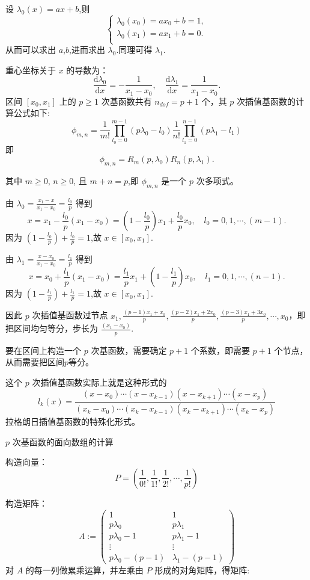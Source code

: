 \documentclass[12pt,a4paper]{article}
\begin{document}
设 $\lambda_0 (x)=ax+b$,则
$$
\begin{cases}
\lambda _0 (x_0)=ax_0+b=1,\\
\lambda _0 (x_1)=ax_1+b=0.\\
\end{cases}
$$
从而可以求出 $a$,$b$,进而求出 $\lambda _0$.同理可得 $\lambda _1$.

重心坐标关于 $x$ 的导数为：
$$
\frac{\mathrm d \lambda_0}{\mathrm dx} = -\frac{1}{x_1 - x_0},\quad 
\frac{\mathrm d \lambda_1}{\mathrm dx} = \frac{1}{x_1 - x_0}.
$$
区间 $[x_0, x_1]$ 上的 $p\geq 1$ 次基函数共有 
$n_{dof} = p+1$ 个，其 $p$ 次插值基函数的计算公式如下:
$$
\phi_{m,n}= \frac{1}{m!}\prod_{l_0 = 0}^{m - 1}(p\lambda_0 -l_0)\frac{1}{n!}\prod_{l_1 = 0}^{n - 1}(p\lambda_1 -l_1)
$$
即
$$
\phi_{m,n}= R_m (p,\lambda_0)R_n (p,\lambda_1).
$$

其中 $m\geq 0$, $n\geq 0$, 且 $m+n=p$,即 $\phi_{m,n}$ 是一个 $p$ 次多项式。

由 $\lambda_0=\frac{x_1 - x}{x_1 - x_0}=\frac{l_0}{p}$ 得到
$$
x=x_1-\frac{l_0}{p} (x_1 - x_0)=(1-\frac{l_0}{p})x_1 + \frac{l_0}{p} x_0,\quad l_0=0,1,\cdots ,(m-1).
$$
因为 $(1-\frac{l_0}{p}) + \frac{l_0}{p} =1$,故 $x\in [x_0,x_1].$

由 $\lambda_1=\frac{x - x_0}{x_1 - x_0}=\frac{l_1}{p}$ 得到
$$
x=x_0+\frac{l_1}{p} (x_1 - x_0)=\frac{l_1}{p} x_1 + (1-\frac{l_1}{p})x_0,\quad l_1=0,1,\cdots ,(n-1).
$$
因为 $(1-\frac{l_1}{p}) + \frac{l_1}{p} =1$,故 $x\in [x_0,x_1].$

因此 $p$ 次插值基函数过节点 $x_1,\frac{(p-1)x_1 + x_0}{p},\frac{(p-2)x_1 + 2x_0}{p},\frac{(p-3)x_1 + 3x_0}{p},\cdots,x_0$，即把区间均匀等分，步长为 $\frac{(x_1-x_0)}{p}$.

要在区间上构造一个 $p$ 次基函数，需要确定 $p+1$ 个系数，即需要 $p+1$ 个节点，从而需要把区间$p$等分。

这个 $p$ 次插值基函数实际上就是这种形式的
$$
l_k(x)=\frac{(x-x_0)\cdots(x-x_{k-1})(x-x_{k+1})\cdots(x - x_p)}{(x_k-x_0)\cdots(x_k-x_{k-1})(x_k-x_{k+1})\cdots(x_k-x_p)}
$$
拉格朗日插值基函数的特殊化形式。

$p$ 次基函数的面向数组的计算

构造向量：
$$
P = ( \frac{1}{0!},  \frac{1}{1!}, \frac{1}{2!}, \cdots, \frac{1}{p!})
$$

构造矩阵：
$$
A :=                                                                            
\begin{pmatrix}  
1  &  1  \\
p\lambda_0 & p\lambda_1\\                                             
p\lambda_0 - 1 & p\lambda_1 - 1\\   
\vdots & \vdots \\                                                     
p\lambda_0 - (p - 1) & \lambda_1 - (p - 1)
\end{pmatrix}                                                                   
$$ 
对 $A$ 的每一列做累乘运算，并左乘由 $P$ 形成的对角矩阵，得矩阵:
\end{document}

